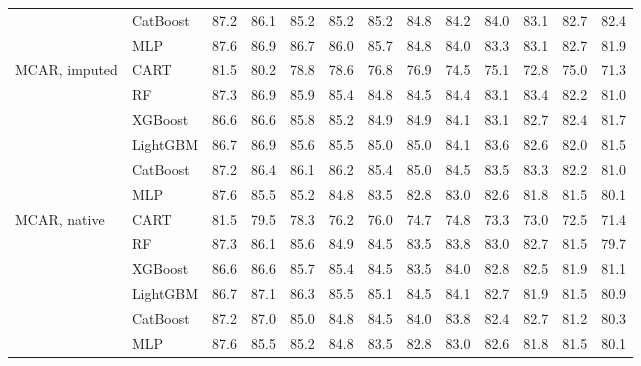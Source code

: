 \begin{table}[p]
\begin{tabular}{@{}llrrrrrrrrrrr@{}}
 & CatBoost & 87.2 & 86.1 & 85.2 & 85.2 & 85.2 & 84.8 & 84.2 & 84.0 & 83.1 & 82.7 & 82.4 \\
 & MLP & 87.6 & 86.9 & 86.7 & 86.0 & 85.7 & 84.8 & 84.0 & 83.3 & 83.1 & 82.7 & 81.9 \\
\midrule
MCAR, imputed & CART & 81.5 & 80.2 & 78.8 & 78.6 & 76.8 & 76.9 & 74.5 & 75.1 & 72.8 & 75.0 & 71.3 \\
 & RF & 87.3 & 86.9 & 85.9 & 85.4 & 84.8 & 84.5 & 84.4 & 83.1 & 83.4 & 82.2 & 81.0 \\
 & XGBoost & 86.6 & 86.6 & 85.8 & 85.2 & 84.9 & 84.9 & 84.1 & 83.1 & 82.7 & 82.4 & 81.7 \\
 & LightGBM & 86.7 & 86.9 & 85.6 & 85.5 & 85.0 & 85.0 & 84.1 & 83.6 & 82.6 & 82.0 & 81.5 \\
 & CatBoost & 87.2 & 86.4 & 86.1 & 86.2 & 85.4 & 85.0 & 84.5 & 83.5 & 83.3 & 82.2 & 81.0 \\
 & MLP & 87.6 & 85.5 & 85.2 & 84.8 & 83.5 & 82.8 & 83.0 & 82.6 & 81.8 & 81.5 & 80.1 \\
\midrule
MCAR, native & CART & 81.5 & 79.5 & 78.3 & 76.2 & 76.0 & 74.7 & 74.8 & 73.3 & 73.0 & 72.5 & 71.4 \\
 & RF & 87.3 & 86.1 & 85.6 & 84.9 & 84.5 & 83.5 & 83.8 & 83.0 & 82.7 & 81.5 & 79.7 \\
 & XGBoost & 86.6 & 86.6 & 85.7 & 85.4 & 84.5 & 83.5 & 84.0 & 82.8 & 82.5 & 81.9 & 81.1 \\
 & LightGBM & 86.7 & 87.1 & 86.3 & 85.5 & 85.1 & 84.5 & 84.1 & 82.7 & 81.9 & 81.5 & 80.9 \\
 & CatBoost & 87.2 & 87.0 & 85.0 & 84.8 & 84.5 & 84.0 & 83.8 & 82.4 & 82.7 & 81.2 & 80.3 \\
 & MLP & 87.6 & 85.5 & 85.2 & 84.8 & 83.5 & 82.8 & 83.0 & 82.6 & 81.8 & 81.5 & 80.1 \\
\bottomrule
\end{tabular}
\end{table}

